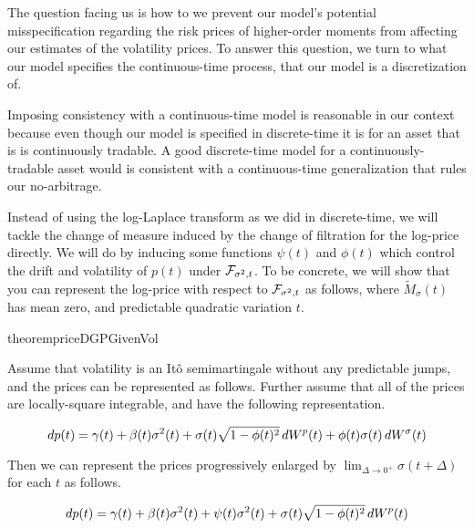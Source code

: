 \documentclass[11pt, letterpaper, twoside, final]{article}
\begin{document}
The question facing us is how to we prevent our model's potential misspecification regarding the risk prices of
higher-order moments from affecting our estimates of the volatility prices.
To answer this question, we turn to what our model specifies the continuous-time process, that our model is a
discretization of.

Imposing consistency with a continuous-time model is reasonable in our context because even though our model is
specified in discrete-time it is for an asset that is is continuously tradable.
A good discrete-time model for a continuously-tradable asset would is consistent with a continuous-time
generalization that rules our no-arbitrage.

Instead of using the log-Laplace transform as we did in discrete-time, we will tackle the change of measure
induced by the change of filtration for the log-price directly.
We will do by inducing some functions $\psi(t)$ and $\phi(t)$ which control the drift and volatility of $p(t)$
under $\mathcal{F}_{\sigma^2,t}$.
To be concrete, we will show that you can represent the log-price with respect to $\mathcal{F}_{\sigma^2,t}$ as follows,
where $\widetilde{M}_{\sigma}(t)$ has mean zero, and predictable quadratic variation  $t$.

\begin{restatable}{theorem}{priceDGPGivenVol}
    \label{defn:logPriceGivenVol}

    Assume that volatility is an It\^{o} semimartingale without any predictable jumps, and the prices can be
    represented as follows.
    Further assume that all of the prices are locally-square integrable, and have the following representation.

    \begin{equation}
        \mathop{}\!d p(t) = \gamma(t) + \beta(t) \sigma^2(t) + \sigma(t) \sqrt{1 - \phi(t)^2} \mathop{}\!d W^p(t) + \phi(t)
        \sigma(t) \mathop{}\!d W^{\sigma}(t) 
    \end{equation}

    Then we can represent the prices progressively enlarged by $\lim_{\Delta \to 0^{+}} \sigma(t + \Delta)$ for
    each $t$ as follows.

    \begin{equation}
        \label{eqn:eqn:price_process_decomp}
        \mathop{}\!d p(t) = \gamma(t) + \beta(t) \sigma^2(t) + \psi(t) \sigma^2(t) + \sigma(t) \sqrt{1 - \phi(t)^2} \mathop{}\!d
        W^p(t) 
    \end{equation}

\end{restatable}
\end{document}
